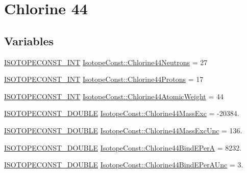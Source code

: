 \hypertarget{group___isotope_const-_chlorine-_cl44}{}\section{Chlorine 44}
\label{group___isotope_const-_chlorine-_cl44}
\subsection*{Variables}
\begin{DoxyCompactItemize}
\item 
\mbox{\hyperlink{group___isotope_const-_macros_ga5f18360b3e99483a35c32d789e62621c}{I\+S\+O\+T\+O\+P\+E\+C\+O\+N\+S\+T\+\_\+\+I\+NT}} \mbox{\hyperlink{group___isotope_const-_chlorine-_cl44_gab5af3b7878aeaf1733219e142bac1d2c}{Isotope\+Const\+::\+Chlorine44\+Neutrons}} = 27
\item 
\mbox{\hyperlink{group___isotope_const-_macros_ga5f18360b3e99483a35c32d789e62621c}{I\+S\+O\+T\+O\+P\+E\+C\+O\+N\+S\+T\+\_\+\+I\+NT}} \mbox{\hyperlink{group___isotope_const-_chlorine-_cl44_gab58a8a26c44620da55a32b6e10521a26}{Isotope\+Const\+::\+Chlorine44\+Protons}} = 17
\item 
\mbox{\hyperlink{group___isotope_const-_macros_ga5f18360b3e99483a35c32d789e62621c}{I\+S\+O\+T\+O\+P\+E\+C\+O\+N\+S\+T\+\_\+\+I\+NT}} \mbox{\hyperlink{group___isotope_const-_chlorine-_cl44_ga0312be03f20efadc0fd5e320f1112e36}{Isotope\+Const\+::\+Chlorine44\+Atomic\+Weight}} = 44
\item 
\mbox{\hyperlink{group___isotope_const-_macros_ga8f45a7272ce02c0b4c65c44636ed719a}{I\+S\+O\+T\+O\+P\+E\+C\+O\+N\+S\+T\+\_\+\+D\+O\+U\+B\+LE}} \mbox{\hyperlink{group___isotope_const-_chlorine-_cl44_gaa587de9101ef5c66590505f061ef2b72}{Isotope\+Const\+::\+Chlorine44\+Mass\+Exc}} = -\/20384.
\item 
\mbox{\hyperlink{group___isotope_const-_macros_ga8f45a7272ce02c0b4c65c44636ed719a}{I\+S\+O\+T\+O\+P\+E\+C\+O\+N\+S\+T\+\_\+\+D\+O\+U\+B\+LE}} \mbox{\hyperlink{group___isotope_const-_chlorine-_cl44_gae7bbedf767f9d22c32701991a8b33af4}{Isotope\+Const\+::\+Chlorine44\+Mass\+Exc\+Unc}} = 136.
\item 
\mbox{\hyperlink{group___isotope_const-_macros_ga8f45a7272ce02c0b4c65c44636ed719a}{I\+S\+O\+T\+O\+P\+E\+C\+O\+N\+S\+T\+\_\+\+D\+O\+U\+B\+LE}} \mbox{\hyperlink{group___isotope_const-_chlorine-_cl44_ga284eb0cbde8a3109fd0e9c3016d1d8b2}{Isotope\+Const\+::\+Chlorine44\+Bind\+E\+PerA}} = 8232.
\item 
\mbox{\hyperlink{group___isotope_const-_macros_ga8f45a7272ce02c0b4c65c44636ed719a}{I\+S\+O\+T\+O\+P\+E\+C\+O\+N\+S\+T\+\_\+\+D\+O\+U\+B\+LE}} \mbox{\hyperlink{group___isotope_const-_chlorine-_cl44_ga70c9a435bb9e39019767ad5e8a261578}{Isotope\+Const\+::\+Chlorine44\+Bind\+E\+Per\+A\+Unc}} = 3.

\end{DoxyCompactItemize}
